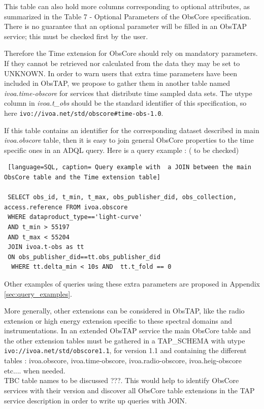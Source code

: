 \documentclass[11pt,a4paper]{ivoa}
\begin{document}
 This table can also hold more columns corresponding to  optional attributes, as summarized in the Table 7 - Optional Parameters  of the ObsCore specification.
 There is no guarantee that an optional parameter will be filled in an ObsTAP service; this must be checked first by the user.

 Therefore the Time extension for ObsCore should rely on mandatory parameters.
 If they cannot be retrieved nor calculated from the data they may be set to UNKNOWN.
 In order to warn users that extra time parameters have been included in ObsTAP, we propose to gather them  in another table named \emph{ivoa.time-obscore}
 for services that distribute time sampled data sets.
 The utype column in  \emph{ivoa.t\_obs} should be the standard identifier of this specification, so here \texttt{ivo://ivoa.net/std/obscore\#time-obs-1.0}.

 If this table contains an identifier for the corresponding dataset described in main \emph{ivoa.obscore} table, then it is easy to join  general ObsCore properties to the time specific ones in an ADQL query.
 Here is a query  example :  ( to be checked)
 \begin{lstlisting} [language=SQL, caption= Query example with  a JOIN between the main ObsCore table and the Time extension table]

 SELECT obs_id, t_min, t_max, obs_publisher_did, obs_collection, access.reference FROM ivoa.obscore
 WHERE dataproduct_type=='light-curve'
 AND t_min > 55197
 AND t_max < 55204
 JOIN ivoa.t-obs as tt
 ON obs_publisher_did==tt.obs_publisher_did
  WHERE tt.delta_min < 10s AND  tt.t_fold == 0
 \end{lstlisting}

Other examples of queries using these extra parameters are proposed in Appendix \ref{sec:query_examples}.

More generally, other extensions can be considered in ObsTAP, like the radio extension or high energy extension specific to these spectral domains and instrumentations.
In an extended ObsTAP service the main ObsCore table and the other extension tables must be gathered in a TAP\_SCHEMA with utype \\ \texttt{ivo://ivoa.net/std/obscore1.1}, for version 1.1 and containing the different tables : ivoa.obscore, ivoa.time-obscore, ivoa.radio-obscore, ivoa.heig-obscore etc.... when needed. \\
TBC table names to be discussed ???.
This would help to identify ObsCore services with their version and discover all ObsCore table extensions in the TAP service description in order to write up queries with JOIN.
\end{document}
